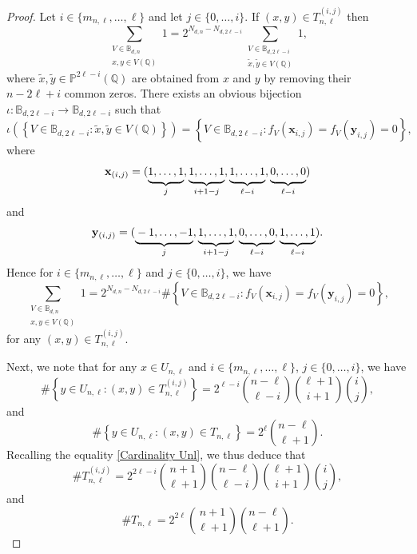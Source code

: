 \documentclass[11pt, reqno]{amsart}
\numberwithin{equation}{section}
\newcommand{\QQ}{\mathbb{Q}}
\newcommand{\xx}{\mathbf{x}}
\newcommand{\yy}{\mathbf{y}}
\begin{document}
\begin{proof}
Let $i\in \{m_{n,\ell},\dots,\ell\}$ and let $j\in \{0,\dots,i\}$. If $(x,y)\in T_{n,\ell}^{(i,j)}$ then 
$$
\sum_{\substack{V \in \mathbb{B}_{d,n} \\ x, y \in V(\mathbb{Q})}} 1=
2^{N_{d,n}-N_{d,2\ell-i}} 
\sum_{\substack{V \in \mathbb{B}_{d,2\ell-i} \\ \tilde x, \tilde y \in V(\mathbb{Q})}} 1,
$$
where $\tilde x, \tilde y\in \mathbb{P}^{2\ell-i}(\QQ)$ are obtained from $x$ and $y$ by removing their $n-2\ell+i$ common zeros. There exists an obvious bijection 
$\iota:  \mathbb{B}_{d,2\ell-i}\to \mathbb{B}_{d,2\ell-i}$ such that 
$$
\iota\left(
\left\{ 
V \in \mathbb{B}_{d,2\ell-i}: \tilde x, \tilde y \in V(\mathbb{Q})\right\}\right)=
\left\{ 
V \in \mathbb{B}_{d,2\ell-i} : f_V(\xx_{i,j})=f_V(\yy_{i,j})=0\right\},
$$
where
$$
\xx_{(i,j)} = (\underbrace{\strut 1 , \ldots , 1}_{j} , \underbrace{\strut 1 , \dots , 1}_{i+1-j} , 
\underbrace{\strut 1 , \dots , 1}_{\ell-i} , \underbrace{\strut 0 , \dots , 0}_{\ell-i})
$$
and 
$$
\yy_{(i,j)} = (\underbrace{\strut -1 , \dots , -1}_{j} , \underbrace{\strut 1 , \dots , 1}_{i+1-j} , 
\underbrace{\strut 0 , \dots , 0}_{\ell-i} , \underbrace{\strut 1 , \dots , 1}_{\ell-i}).
$$
Hence for 
 $i\in \{m_{n,\ell},\dots,\ell\}$ and $j\in \{0,\dots,i\}$, we have 
\begin{equation}\label{eq:**}
\sum_{\substack{V \in \mathbb{B}_{d,n} \\ x, y \in V(\mathbb{Q})}} 1=
2^{N_{d,n}-N_{d,2\ell-i}} 
\#\left\{V \in \mathbb{B}_{d,2\ell-i} :
f_V(\xx_{i,j})=f_V(\yy_{i,j})=0\right\},
\end{equation}
for  any $(x,y)\in T_{n,\ell}^{(i,j)}$.

Next, we note that for any $x \in U_{n,\ell}$ and $i \in \{m_{n,\ell}, \dots, \ell\}$, $j \in \{0, \dots, i\}$, we have 
\begin{equation*}
\# \left \{ y \in U_{n,\ell} : (x, y) \in T_{n,\ell}^{(i,j)} \right\} = 2^{\ell-i} \binom{n-\ell}{\ell-i} \binom{\ell+1}{i+1} \binom{i}{j},
\end{equation*}
and
\begin{equation*}
\# \left \{ y \in U_{n,\ell} : (x, y) \in T_{n,\ell} \right\} = 2^{\ell} \binom{n-\ell}{\ell+1}.
\end{equation*}
Recalling the equality \eqref{Cardinality Unl}, we thus deduce that
\begin{equation}
\label{Cardinality Tnlij}
\# T_{n,\ell}^{(i,j)} = 2^{2\ell-i} \binom{n+1}{\ell+1} \binom{n-\ell}{\ell-i} \binom{\ell+1}{i+1} \binom{i}{j},
\end{equation}
and
\begin{equation}
\label{Cardinality Tnl}
\# T_{n,\ell} = 2^{2 \ell} \binom{n+1}{\ell+1} \binom{n-\ell}{\ell+1}.
\end{equation}


\end{proof}
\end{document}

